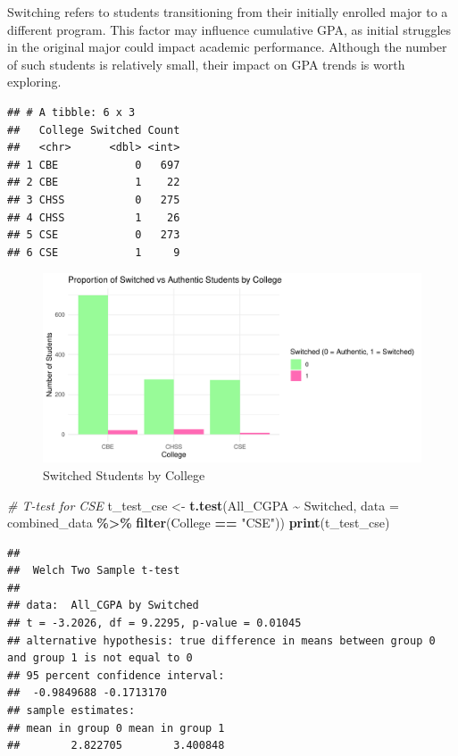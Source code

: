 \documentclass[
  12pt,
]{article}
\newenvironment{Shaded}{\begin{snugshade}}{\end{snugshade}}
\newcommand{\AttributeTok}[1]{\textcolor[rgb]{0.13,0.29,0.53}{#1}}
\newcommand{\CommentTok}[1]{\textcolor[rgb]{0.56,0.35,0.01}{\textit{#1}}}
\newcommand{\FunctionTok}[1]{\textcolor[rgb]{0.13,0.29,0.53}{\textbf{#1}}}
\newcommand{\NormalTok}[1]{#1}
\newcommand{\OtherTok}[1]{\textcolor[rgb]{0.56,0.35,0.01}{#1}}
\newcommand{\SpecialCharTok}[1]{\textcolor[rgb]{0.81,0.36,0.00}{\textbf{#1}}}
\newcommand{\StringTok}[1]{\textcolor[rgb]{0.31,0.60,0.02}{#1}}
\begin{document}
Switching refers to students transitioning from their initially enrolled
major to a different program. This factor may influence cumulative GPA,
as initial struggles in the original major could impact academic
performance. Although the number of such students is relatively small,
their impact on GPA trends is worth exploring.

\begin{verbatim}
## # A tibble: 6 x 3
##   College Switched Count
##   <chr>      <dbl> <int>
## 1 CBE            0   697
## 2 CBE            1    22
## 3 CHSS           0   275
## 4 CHSS           1    26
## 5 CSE            0   273
## 6 CSE            1     9
\end{verbatim}

\begin{figure}
\includegraphics[width=0.9\linewidth]{iesm315_report_files/figure-latex/unnamed-chunk-28-1} \caption{Switched Students by College}\label{fig:unnamed-chunk-28}
\end{figure}

\begin{Shaded}
\begin{Highlighting}[]
\CommentTok{\# T{-}test for CSE}
\NormalTok{t\_test\_cse }\OtherTok{\textless{}{-}} \FunctionTok{t.test}\NormalTok{(All\_CGPA }\SpecialCharTok{\textasciitilde{}}\NormalTok{ Switched, }\AttributeTok{data =}\NormalTok{ combined\_data }\SpecialCharTok{\%\textgreater{}\%}
    \FunctionTok{filter}\NormalTok{(College }\SpecialCharTok{==} \StringTok{"CSE"}\NormalTok{))}
\FunctionTok{print}\NormalTok{(t\_test\_cse)}
\end{Highlighting}
\end{Shaded}

\begin{verbatim}
## 
##  Welch Two Sample t-test
## 
## data:  All_CGPA by Switched
## t = -3.2026, df = 9.2295, p-value = 0.01045
## alternative hypothesis: true difference in means between group 0 and group 1 is not equal to 0
## 95 percent confidence interval:
##  -0.9849688 -0.1713170
## sample estimates:
## mean in group 0 mean in group 1 
##        2.822705        3.400848
\end{verbatim}
\end{document}
